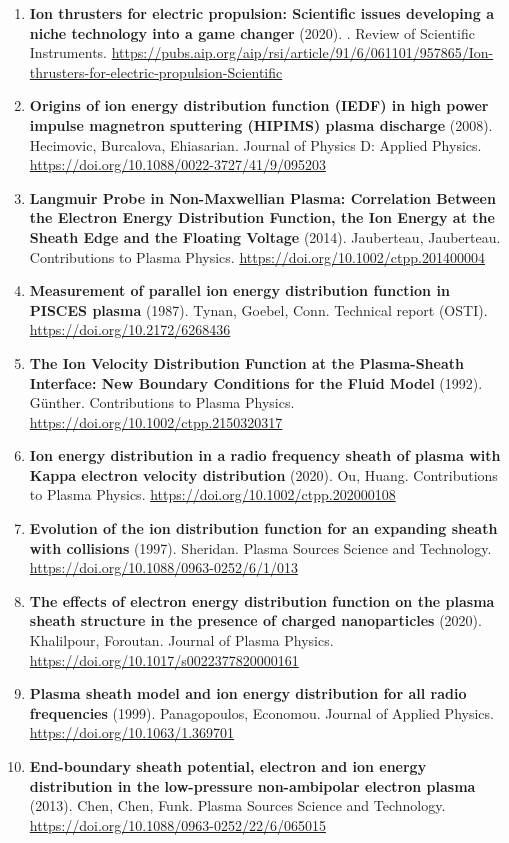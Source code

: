 \documentclass[11pt,a4paper]{article}
\begin{document}
\begin{enumerate}[leftmargin=1.4em]
\item \textbf{Ion thrusters for electric propulsion: Scientific issues developing a niche technology into a game changer} (2020). . Review of Scientific Instruments. \url{https://pubs.aip.org/aip/rsi/article/91/6/061101/957865/Ion-thrusters-for-electric-propulsion-Scientific}
\item \textbf{Origins of ion energy distribution function (IEDF) in high power impulse magnetron sputtering (HIPIMS) plasma discharge} (2008). Hecimovic, Burcalova, Ehiasarian. Journal of Physics D: Applied Physics. \url{https://doi.org/10.1088/0022-3727/41/9/095203}
\item \textbf{Langmuir Probe in Non-Maxwellian Plasma: Correlation Between the Electron Energy Distribution Function, the Ion Energy at the Sheath Edge and the Floating Voltage} (2014). Jauberteau, Jauberteau. Contributions to Plasma Physics. \url{https://doi.org/10.1002/ctpp.201400004}
\item \textbf{Measurement of parallel ion energy distribution function in PISCES plasma} (1987). Tynan, Goebel, Conn. Technical report (OSTI). \url{https://doi.org/10.2172/6268436}
\item \textbf{The Ion Velocity Distribution Function at the Plasma-Sheath Interface: New Boundary Conditions for the Fluid Model} (1992). Günther. Contributions to Plasma Physics. \url{https://doi.org/10.1002/ctpp.2150320317}
\item \textbf{Ion energy distribution in a radio frequency sheath of plasma with Kappa electron velocity distribution} (2020). Ou, Huang. Contributions to Plasma Physics. \url{https://doi.org/10.1002/ctpp.202000108}
\item \textbf{Evolution of the ion distribution function for an expanding sheath with collisions} (1997). Sheridan. Plasma Sources Science and Technology. \url{https://doi.org/10.1088/0963-0252/6/1/013}
\item \textbf{The effects of electron energy distribution function on the plasma sheath structure in the presence of charged nanoparticles} (2020). Khalilpour, Foroutan. Journal of Plasma Physics. \url{https://doi.org/10.1017/s0022377820000161}
\item \textbf{Plasma sheath model and ion energy distribution for all radio frequencies} (1999). Panagopoulos, Economou. Journal of Applied Physics. \url{https://doi.org/10.1063/1.369701}
\item \textbf{End-boundary sheath potential, electron and ion energy distribution in the low-pressure non-ambipolar electron plasma} (2013). Chen, Chen, Funk. Plasma Sources Science and Technology. \url{https://doi.org/10.1088/0963-0252/22/6/065015}

\end{enumerate}
\end{document}
